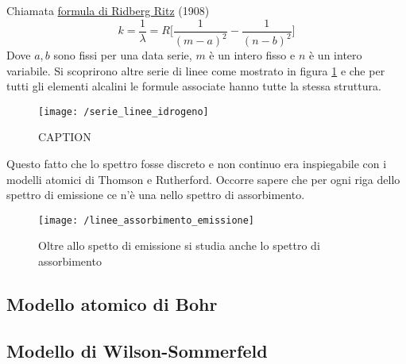 Chiamata \underline{formula di Ridberg Ritz} (1908)
\begin{equation}
k = \frac{1}{\lambda} = R \biggl[ \frac{1}{(m-a)^2} - \frac{1}{(n-b)^2}  \biggr]
\end{equation}
Dove $a, b$ sono fissi per una data serie, $m$ è un intero fisso e $n$ è un intero variabile.
Si scoprirono altre serie di linee come mostrato in figura \ref{serie_linee} e che per tutti gli elementi alcalini le formule associate hanno tutte la stessa struttura.
\begin{figure}[h]
\centering
\texttt{[image: /serie\_linee\_idrogeno]}
\caption{CAPTION}
\label{serie_linee}
\end{figure}
Questo fatto che lo spettro fosse discreto e non continuo era inspiegabile con i modelli atomici di Thomson e Rutherford. 
Occorre sapere che per ogni riga dello spettro di emissione ce n'è una nello spettro di assorbimento.
\begin{figure}[h]
\centering
\texttt{[image: /linee\_assorbimento\_emissione]}
\caption{Oltre allo spetto di emissione si studia anche lo spettro di assorbimento}
\end{figure}



\subsection{Modello atomico di Bohr}








\subsection{Modello di Wilson-Sommerfeld}








